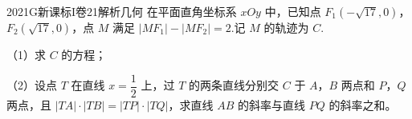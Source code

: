 
\begin{problem}{2021}{G}{新课标I卷}{21}{解析几何}
在平面直角坐标系 $ xOy $ 中，已知点 $ F_1(-\sqrt{17},0) $，$ F_2(\sqrt{17},0) $，点 $ M $ 满足 $ |MF_1|-|MF_2|=2 $.记 $ M $ 的轨迹为 $ C $.

（1）求 $ C $ 的方程；

（2）设点 $ T $ 在直线 $ x=\dfrac{1}{2} $ 上，过 $ T $ 的两条直线分别交 $ C $ 于 $ A $，$ B $ 两点和 $ P $，$ Q $ 两点，且 $ |TA|\cdot|TB|=|TP|\cdot|TQ| $，求直线 $ AB $ 的斜率与直线 $ PQ $ 的斜率之和。
\end{problem}

\begin{answer}

\end{answer}

\begin{solutions}

\end{solutions}